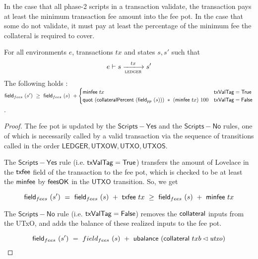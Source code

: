 \begin{property}
  \label{prop:pay-fees}

In the case that all phase-2 scripts in a transaction validate, the transaction pays
at least the minimum transaction fee amount into the fee pot. In the case that
some do not validate, it must pay at least the percentage of the minimum fee
the collateral is required to cover.

\begin{lemma}
  For all environments $e$, transactions $tx$ and states $s, s'$ such that
  \begin{equation*}
    e\vdash s\trans{ledger}{tx}s'
  \end{equation*}
  The following holds : \\
  $\mathsf{field}_{fees}~(s')~\geq~\mathsf{field}_{fees}~(s)~+
  \begin{cases}
    \mathsf{minfee}~{tx} & \mathsf{txValTag} = \mathsf{True} \\
    \mathsf{quot}~(\mathsf{collateralPercent}~(\mathsf{field}_{pp}~(s)))~*~(\mathsf{minfee}~{tx})~100 & \mathsf{txValTag} = \mathsf{False}\\
  \end{cases}$.
\end{lemma}
\begin{proof}
  The fee pot is updated by the $\mathsf{Scripts{-}Yes}$ and the $\mathsf{Scripts{-}No}$
  rules, one of which is necessarily called by a valid transaction via the sequence
  of transitions called in the order $\mathsf{LEDGER}, \mathsf{UTXOW}, \mathsf{UTXO}, \mathsf{UTXOS}$.

  The $\mathsf{Scripts{-}Yes}$ rule (i.e. $\mathsf{txValTag} = \mathsf{True}$)
  transfers the amount of Lovelace in the $\mathsf{txfee}$ field of the
  transaction to the fee pot, which is checked to be at least the $\mathsf{minfee}$
  by $\mathsf{feesOK}$ in the $\mathsf{UTXO}$ transition. So, we get

  \[\mathsf{field}_{fees}~(s')~=~\mathsf{field}_{fees}~(s)~+~\mathsf{txfee}~{tx}~\geq~\mathsf{field}_{fees}~(s)~+~\mathsf{minfee}~{tx}\]

  The $\mathsf{Scripts{-}No}$ rule (i.e. $\mathsf{txValTag} = \mathsf{False}$) removes the
  $\mathsf{collateral}$ inputs from the
  UTxO, and adds the balance of these realized inputs to the fee pot.

  \[\mathsf{field}_{fees}~(s')~=~field_{fees}~(s)~+~\mathsf{ubalance}~(\mathsf{collateral}~{txb} \lhd \mathit{utxo})\]


\end{proof}
\end{property}
